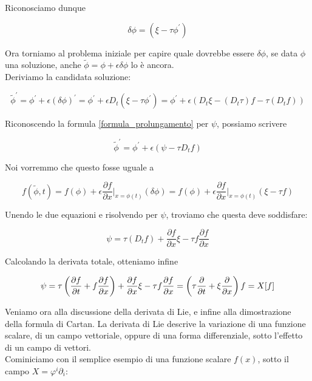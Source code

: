\documentclass{report}
\begin{document}
Riconosciamo dunque 

\begin{equation}
    \delta\phi = (\xi - \tau\phi^{'})
\end{equation}

Ora torniamo al problema iniziale per capire quale dovrebbe essere $\delta\phi$, se data $\phi$ una soluzione, anche $\tilde{\phi} = \phi + \epsilon\delta\phi$ lo è ancora. \\

Deriviamo la candidata soluzione: 

\begin{equation}
    \tilde{\phi}^{'} = \phi^{'} + \epsilon(\delta\phi)^{'} = \phi^{'} + \epsilon D_t(\xi -\tau\phi^{'}) = \phi^{'} + \epsilon(D_t\xi - (D_t\tau)f - \tau(D_tf))
\end{equation}

Riconoscendo la formula \ref{formula_prolungamento} per $\psi$, possiamo scrivere 

\begin{equation}
    \tilde{\phi}^{'} = \phi^{'} + \epsilon(\psi - \tau D_tf)
\end{equation}

Noi vorremmo che questo fosse uguale a 

\begin{equation}
    f(\tilde{\phi}, t) = f(\phi) + \epsilon \frac{\partial f}{\partial x}\biggr|_{x = \phi(t)} (\delta\phi) = f(\phi) + \epsilon \frac{\partial f}{\partial x}\biggr|_{x = \phi(t)}(\xi - \tau f)
\end{equation}

Unendo le due equazioni e risolvendo per $\psi$, troviamo che questa deve soddisfare: 

\begin{equation}
    \psi = \tau(D_tf) + \frac{\partial f}{\partial x}\xi - \tau f \frac{\partial f}{\partial x}
\end{equation}

Calcolando la derivata totale, otteniamo infine 

\begin{equation}
    \psi = \tau\left(\frac{\partial f}{\partial t} + f\frac{\partial f}{\partial x}\right) + \frac{\partial f}{\partial x}\xi - \tau f \frac{\partial f}{\partial x} = \left(\tau \frac{\partial }{\partial t} + \xi\frac{\partial }{\partial x}\right)f = X[f]
    \\
\end{equation}


Veniamo ora alla discussione della derivata di Lie, e infine alla dimostrazione della formula di Cartan. La derivata di Lie descrive la variazione di una funzione scalare, di un campo vettoriale, oppure di una forma differenziale, sotto l'effetto di un campo di vettori. \\
Cominiciamo con il semplice esempio di una funzione scalare $f(x)$, sotto il campo $X = \varphi^i\partial_i$: 
\end{document}
